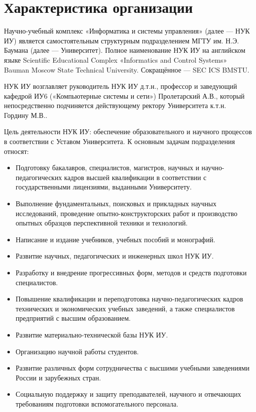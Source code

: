 \section{Характеристика организации}

Научно-учебный комплекс «Информатика и системы управления» \cite{Requlations-SEC-ISC} (далее --- НУК ИУ) является самостоятельным структурным подразделением МГТУ им. Н.Э. Баумана (далее --- Университет). Полное наименование НУК ИУ на английском языке Scientific Educational Complex «Informatics and Control Systems» Bauman Moscow State Technical University. Сокращённое --- SEC ICS BMSTU.

НУК ИУ возглавляет руководитель НУК ИУ д.т.н., профессор и заведующий кафедрой ИУ6 («Компьютерные системы и сети») Пролетарский А.В., который непосредственно подчиняется действующему ректору Университета к.т.н. Гордину М.В..

Цель деятельности НУК ИУ: обеспечение образовательного и научного процессов в соответствии с Уставом Университета. К основным задачам подразделения относят:

\begin{itemize}[leftmargin=0pt,itemindent=4.6em]
    \item Подготовку бакалавров, специалистов, магистров, научных и научно-педагогических кадров высшей квалификации в соответствии с государственными лицензиями, выданными Университету. 
        
    \item Выполнение фундаментальных, поисковых и прикладных научных исследований, проведение опытно-конструкторских работ и производство опытных образцов перспективной техники и технологий. 
        
    \item Написание и издание учебников, учебных пособий и монографий. 
        
    \item Развитие научных, педагогических и инженерных школ НУК ИУ. 

    \item Разработку и внедрение прогрессивных форм, методов и средств подготовки специалистов. 

    \item Повышение квалификации и переподготовка научно-педагогических кадров технических и экономических учебных заведений, а также специалистов предприятий с высшим образованием. 

    \item Развитие материально-технической базы НУК ИУ. 

    \item Организацию научной работы студентов. 

    \item Развитие различных форм сотрудничества с высшими учебными заведениями России и зарубежных стран. 

    \item Социальную поддержку и защиту преподавателей, научного и отвечающих требованиям подготовки вспомогательного персонала. 
\end{itemize}
